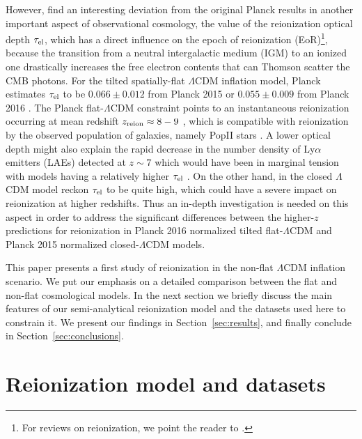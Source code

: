 \documentclass[useAMS,usenatbib]{mnras}
\begin{document}
However, \citet{2017arXiv170703452O,2017arXiv171003271O,2017arXiv171208617O} find an interesting 
deviation from the original Planck results in another important aspect of 
observational cosmology, the value of the reionization optical depth 
$\tau_{\rm el}$, which has a direct influence on the epoch of reionization 
(EoR)\footnote{For reviews on reionization, we point the reader to \cite{LoebBarkana01,
BarkanaLoeb01,2006ARA&A..44..415F,tirth06a,tirth09,2013ASSL..396...45Z,
2014PTEP.2014fB112N,2014arXiv1409.4946F,2016ASSL..423...23L}.},
because the transition from a neutral intergalactic medium (IGM) to an ionized 
one drastically increases the free electron contents that can Thomson 
scatter the CMB photons. For the tilted spatially-flat $\Lambda$CDM inflation 
model, Planck estimates $\tau_{\rm el}$ to be $0.066\pm0.012$ from Planck 2015 \citep{2016A&A...594A..13P} or $0.055\pm 0.009$
from Planck 2016 \citep{2016A&A...596A.107P}. The Planck flat-$\Lambda$CDM 
constraint points to an instantaneous reionization
occurring at mean redshift $z_{\rm reion}\approx8-9$ \citep{2016A&A...596A.108P}, which is compatible with reionization
by the observed population of galaxies, namely PopII stars \citep{2015ApJ...802L..19R,mitra4}.
A lower optical depth might also explain the rapid decrease in the number density of Ly$\alpha$ emitters (LAEs) detected
at $z\sim7$ which would have been in marginal tension with models having a 
relatively higher $\tau_{\rm el}$
\citep{2015MNRAS.446..566M,2015MNRAS.452..261C}. On the other hand, in the 
closed $\Lambda$CDM model \cite{2017arXiv170703452O} reckon $\tau_{\rm el}$
to be quite high, which could have a severe impact on reionization at higher 
redshifts. Thus an in-depth investigation is needed on this aspect in order 
to address the significant differences between
the higher-$z$ predictions for reionization in Planck 2016 normalized 
tilted flat-$\Lambda$CDM and Planck 2015 normalized closed-$\Lambda$CDM models.

This paper presents a first study of reionization in the non-flat $\Lambda$CDM 
inflation scenario. We put our emphasis on a detailed comparison between the 
flat and non-flat cosmological models. In the next section we briefly discuss 
the main features of our semi-analytical reionization model and the datasets 
used here to constrain it. We present our findings in 
Section~\ref{sec:results}, and finally conclude in Section~\ref{sec:conclusions}.

\section{Reionization model and datasets}
\label{sec:cfmodel}
\end{document}
